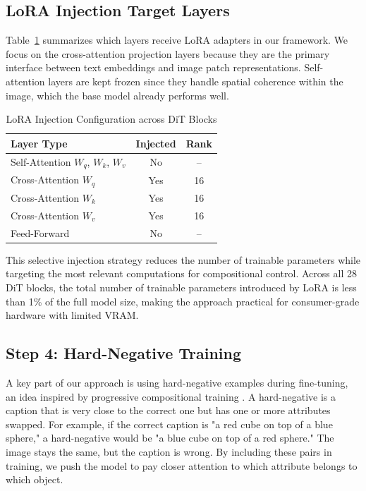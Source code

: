 \documentclass[12pt,onecolumn]{IEEEtran}
\begin{document}
\subsection{LoRA Injection Target Layers}
Table~\ref{tab:lora_layers} summarizes which layers receive LoRA adapters 
in our framework. We focus on the cross-attention projection layers because 
they are the primary interface between text embeddings and image patch 
representations. Self-attention layers are kept frozen since they handle 
spatial coherence within the image, which the base model already performs well.

\begin{table}[h]
\centering
\caption{LoRA Injection Configuration across DiT Blocks}
\label{tab:lora_layers}
\begin{tabular}{lcc}
\hline
\textbf{Layer Type} & \textbf{Injected} & \textbf{Rank} \\
\hline
Self-Attention $W_q$, $W_k$, $W_v$ & No & -- \\
Cross-Attention $W_q$ & Yes & 16 \\
Cross-Attention $W_k$ & Yes & 16 \\
Cross-Attention $W_v$ & Yes & 16 \\
Feed-Forward & No & -- \\
\hline
\end{tabular}
\end{table}

This selective injection strategy reduces the number of trainable parameters 
while targeting the most relevant computations for compositional control. 
Across all 28 DiT blocks, the total number of trainable parameters introduced 
by LoRA is less than 1\% of the full model size, making the approach 
practical for consumer-grade hardware with limited VRAM.

\subsection{Step 4: Hard-Negative Training}
A key part of our approach is using hard-negative examples during fine-tuning, an idea inspired by progressive compositional training \cite{han2025progressivecompositionality}. A hard-negative is a caption that is very close to the correct one but has one or more attributes swapped. For example, if the correct caption is "a red cube on top of a blue sphere," a hard-negative would be "a blue cube on top of a red sphere." The image stays the same, but the caption is wrong. By including these pairs in training, we push the model to pay closer attention to which attribute belongs to which object.
\end{document}
